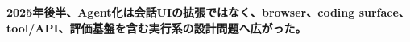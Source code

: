 \noindent\textbf{2025年後半、Agent化は会話UIの拡張ではなく、browser、coding surface、tool/API、評価基盤を含む実行系の設計問題へ広がった。}\autocite{src-7a7213b68631,src-b074ccdb2d9e}
